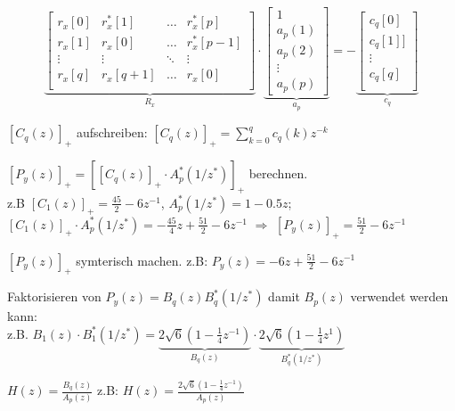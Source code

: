 \begin{aufzaehlung}
  		\small$$
\underbrace{\begin{bmatrix}                   
    		r_x[0] & r_x^*[1] & \hdots & r_x^*[p] \\   
    		r_x[1] & r_x[0] & \hdots & r_x^*[p-1] \\    
    		\vdots & \vdots & \ddots & \vdots \\     
    		r_x[q] & r_x[q+1] & \hdots & r_x[0] \\ 
		\end{bmatrix}  }_{R_x} \cdot \underbrace{\begin{bmatrix}
			1 \\
    		a_p(1) \\
    		a_p(2) \\
    		\vdots \\
    		a_p(p)
		\end{bmatrix}  }_{a_p}= - \underbrace{\begin{bmatrix}
    		 c_q[0]\\            
    		 c_q[1]]\\
    		\vdots \\
    		 c_q[q]\\
		\end{bmatrix}}_{c_{q}} 
		 $$ \normalsize	 
		 \item $[C_q(z)]_+$ aufschreiben: $[C_q(z)]_+ = \sum\limits_{k=0}^q c_q(k)z^{-k}$
		 \item $[P_y(z)]_+=\left[[C_q(z)]_+ \cdot A^*_p(1/z^*)\right]_+$ berechnen. \\
		 z.B $[C_1(z)]_+=\frac{45}{2}-6z^{-1}$, $A^*_p(1/z^*)=1-0.5z$; $[C_1(z)]_+ \cdot A^*_p(1/z^*)= -\frac{45}{4}z +\frac{51}{2}-6z^{-1}$ $\Rightarrow$  $[P_y(z)]_+= \frac{51}{2}-6z^{-1}$
		 \item $[P_y(z)]_+$ symterisch machen. z.B: $P_y(z) =  -6 z +\frac{51}{2}-6z^{-1}$
		 \item Faktorisieren von $P_y(z)=B_q(z)B_q^*(1/z^*)$ damit $B_p(z)$ verwendet werden kann: \\
		 z.B. $B_1(z)\cdot B_1^*(1/z^*)= \underbrace{2\sqrt{6}(1-\frac{1}{4}z^{-1})}_{B_q(z)}\cdot \underbrace{2\sqrt{6}(1-\frac{1}{4}z^{1})}_{B_q^*(1/z^*)}$
		 \item $H(z)=\frac{B_q(z)}{A_p(z)}$ z.B: $H(z)=\frac{2 \sqrt{6}(1-\frac 1 4 z^{-1})}{A_p(z)}$
\end{aufzaehlung}
		 
